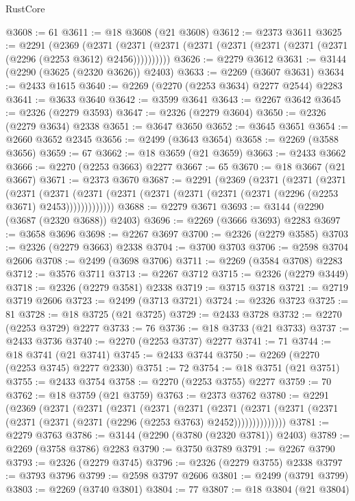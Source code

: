\begin{lexlean}{RustCore}
\begin{coremodule}
@3608 := 61
@3611 := @18 @3608 (@21 @3608)
@3612 := @2373 @3611
@3625 := @2291
    (@2369
      (@2371 (@2371 (@2371 (@2371 (@2371 (@2371 (@2371 (@2371 (@2296 (@2253 @3612) @2456))))))))))
@3626 := @2279 @3612
@3631 := @3144 (@2290 (@3625 (@2320 @3626)) @2403)
@3633 := @2269 (@3607 @3631)
@3634 := @2433 @1615
@3640 := @2269 (@2270 (@2253 @3634) @2277 @2544) @2283
@3641 := @3633 @3640
@3642 := @3599 @3641
@3643 := @2267 @3642
@3645 := @2326 (@2279 @3593)
@3647 := @2326 (@2279 @3604)
@3650 := @2326 (@2279 @3634) @2338
@3651 := @3647 @3650
@3652 := @3645 @3651
@3654 := @2660 @3652 @2345
@3656 := @2499 (@3643 @3654)
@3658 := @2269 (@3588 @3656)
@3659 := 67
@3662 := @18 @3659 (@21 @3659)
@3663 := @2433 @3662
@3666 := @2270 (@2253 @3663) @2277
@3667 := 65
@3670 := @18 @3667 (@21 @3667)
@3671 := @2373 @3670
@3687 := @2291
    (@2369
      (@2371
        (@2371
          (@2371
            (@2371
              (@2371
                (@2371 (@2371 (@2371 (@2371 (@2371 (@2371 (@2296 (@2253 @3671) @2453)))))))))))))
@3688 := @2279 @3671
@3693 := @3144 (@2290 (@3687 (@2320 @3688)) @2403)
@3696 := @2269 (@3666 @3693) @2283
@3697 := @3658 @3696
@3698 := @2267 @3697
@3700 := @2326 (@2279 @3585)
@3703 := @2326 (@2279 @3663) @2338
@3704 := @3700 @3703
@3706 := @2598 @3704 @2606
@3708 := @2499 (@3698 @3706)
@3711 := @2269 (@3584 @3708) @2283
@3712 := @3576 @3711
@3713 := @2267 @3712
@3715 := @2326 (@2279 @3449)
@3718 := @2326 (@2279 @3581) @2338
@3719 := @3715 @3718
@3721 := @2719 @3719 @2606
@3723 := @2499 (@3713 @3721)
@3724 := @2326 @3723
@3725 := 81
@3728 := @18 @3725 (@21 @3725)
@3729 := @2433 @3728
@3732 := @2270 (@2253 @3729) @2277
@3733 := 76
@3736 := @18 @3733 (@21 @3733)
@3737 := @2433 @3736
@3740 := @2270 (@2253 @3737) @2277
@3741 := 71
@3744 := @18 @3741 (@21 @3741)
@3745 := @2433 @3744
@3750 := @2269 (@2270 (@2253 @3745) @2277 @2330)
@3751 := 72
@3754 := @18 @3751 (@21 @3751)
@3755 := @2433 @3754
@3758 := @2270 (@2253 @3755) @2277
@3759 := 70
@3762 := @18 @3759 (@21 @3759)
@3763 := @2373 @3762
@3780 := @2291
    (@2369
      (@2371
        (@2371
          (@2371
            (@2371
              (@2371
                (@2371
                  (@2371 (@2371 (@2371 (@2371 (@2371 (@2371 (@2296 (@2253 @3763) @2452))))))))))))))
@3781 := @2279 @3763
@3786 := @3144 (@2290 (@3780 (@2320 @3781)) @2403)
@3789 := @2269 (@3758 @3786) @2283
@3790 := @3750 @3789
@3791 := @2267 @3790
@3793 := @2326 (@2279 @3745)
@3796 := @2326 (@2279 @3755) @2338
@3797 := @3793 @3796
@3799 := @2598 @3797 @2606
@3801 := @2499 (@3791 @3799)
@3803 := @2269 (@3740 @3801)
@3804 := 77
@3807 := @18 @3804 (@21 @3804)

\end{coremodule}
\end{lexlean}
